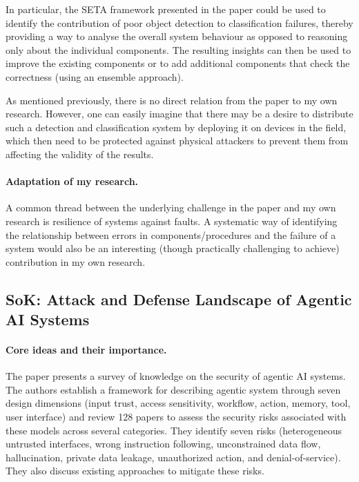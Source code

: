 \documentclass{article}
\begin{document}
In particular, the SETA framework presented in the paper could be used to identify the contribution of poor object detection to classification failures, thereby providing a way to analyse the overall system behaviour as opposed to reasoning only about the individual components. The resulting insights can then be used to improve the existing components or to add additional components that check the correctness (using an ensemble approach).

As mentioned previously, there is no direct relation from the paper to my own research. However, one can easily imagine that there may be a desire to distribute such a detection and classification system by deploying it on devices in the field, which then need to be protected against physical attackers to prevent them from affecting the validity of the results.

\paragraph{Adaptation of my research.}

A common thread between the underlying challenge in the paper and my own research is resilience of systems against faults. A systematic way of identifying the relationship between errors in components/procedures and the failure of a system would also be an interesting (though practically challenging to achieve) contribution in my own research.

\newpage
\subsection{SoK: Attack and Defense Landscape of Agentic AI Systems~\cite{kim2026sok}}


\paragraph{Core ideas and their importance.}

The paper presents a survey of knowledge on the security of agentic AI systems. The authors establish a framework for describing agentic system through seven design dimensions (input trust, access sensitivity, workflow, action, memory, tool, user interface) and review 128 papers to assess the security risks associated with these models across several categories. They identify seven risks (heterogeneous untrusted interfaces, wrong instruction following, unconstrained data flow, hallucination, private data leakage, unauthorized action, and denial-of-service). They also discuss existing approaches to mitigate these risks.
\end{document}
